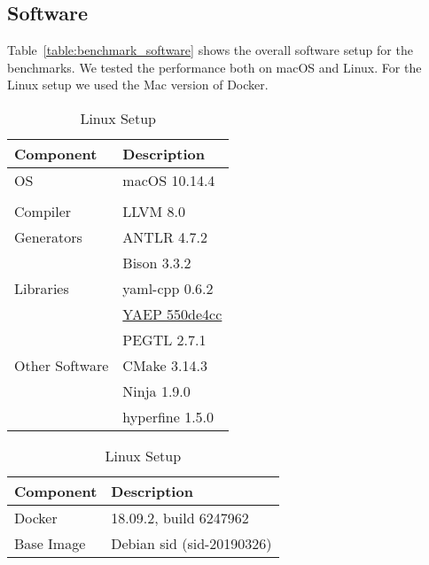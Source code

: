 \subsection{Software}

Table~\ref{table:benchmark_software} shows the overall software setup for the benchmarks. We tested the performance both on macOS and Linux. For the Linux setup we used the Mac version of Docker.

\begin{table}[H]
    \newcommand{\YAEP}[0]{{\href{https://github.com/vnmakarov/yaep/commit/550de4cc5600d5f6109c7ebcfbacec51bf80d8d3}{YAEP 550de4cc}}}
    \caption{Software Setup}
    \label{table:benchmark_software}
    \begin{subtable}[t]{.45\linewidth}
      \centering
        \caption{Mac Setup}
        \label{table:benchmark_mac}
        \begin{tabular}{ll}
\toprule
\textbf{Component} & \textbf{Description}\\
\midrule
                OS &        macOS 10.14.4\\
                   &                     \\
\midrule
          Compiler &             LLVM 8.0\\
        Generators &          ANTLR 4.7.2\\
                   &          Bison 3.3.2\\
         Libraries &       yaml-cpp 0.6.2\\
                   &                \YAEP\\
                   &          PEGTL 2.7.1\\
    Other Software &         CMake 3.14.3\\
                   &          Ninja 1.9.0\\
                   &      hyperfine 1.5.0\\
\bottomrule
        \end{tabular}
    \end{subtable}
    \begin{subtable}[t]{.45\linewidth}
      \centering
        \caption{Linux Setup}
        \label{table:benchmark_docker}
        \begin{tabular}{ll}
\toprule
\textbf{Component} &      \textbf{Description}\\
\midrule
            Docker &    18.09.2, build 6247962\\
        Base Image & Debian sid (sid-20190326)\\

\end{tabular}
\end{subtable}
\end{table}
